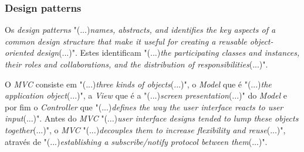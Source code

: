  \subsubsection{Design patterns}
Os \textit{design patterns} "(...)\emph{names, abstracts, and identifies the key aspects of a common design structure that make it useful for creating a reusable object-oriented design}(...)"\citep{dart}. Estes identificam "(...)\emph{the participating classes and instances, their roles and collaborations, and the distribution of responsibilities}(...)"\citep{dart}.

O \textit{MVC} consiste em "(...)\emph{three kinds of objects}(...)"\citep{dart}, o \textit{Model} que é "(...)\emph{the application object}(...)"\citep{dart}, a \textit{View} que é a "(...)\emph{screen presentation}(...)"\citep{dart} do \textit{Model} e por fim o \textit{Controller} que "(...)\emph{defines the way the user interface reacts to user input}(...)"\citep{dart}. Antes do \textit{MVC} "(...)\emph{user interface designs tended to lump these objects together}(...)"\citep{dart}, o \textit{MVC} "(...)\emph{decouples them to increase flexibility and reuse}(...)"\citep{dart}, através de "(...)\emph{establishing a subscribe/notify protocol between them}(...)"\citep{dart}.